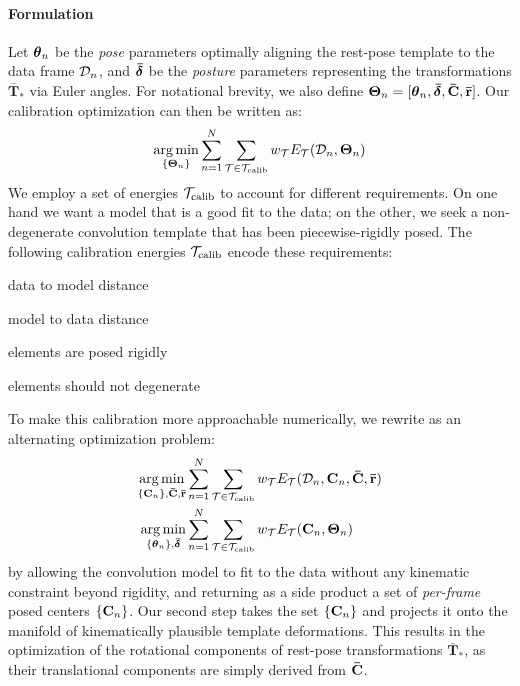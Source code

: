 \paragraph{Formulation}
Let $\boldsymbol{\theta}_n$ be the \emph{pose} parameters optimally aligning the rest-pose template to the data frame $\mathcal{D}_n$, and $\boldsymbol{\bar\delta}$ be the \emph{posture} parameters representing the transformations $\mathbf{\bar{T}}_*$ via Euler angles. For notational brevity, we also define $\boldsymbol{\Theta}_n=[\boldsymbol{\theta}_n, \boldsymbol{\bar\delta}, {\mathbf{\bar{C}}}, {\mathbf{\bar{r}}}]$. Our calibration optimization can then be written as:
% 
\begin{eqnarray}
\operatorname*{arg\,min}_{\{\boldsymbol{\Theta}_n\}}
\sum_{n=1}^N 
\sum_{\mathcal{T} \in {\mathcal{T}_\text{calib}}} 
w_\mathcal{T} E_\mathcal{T}(\mathcal{D}_n, \boldsymbol{\Theta}_n)
\label{eq:calibration}
\end{eqnarray}
% 
We employ a set of energies ${\mathcal{T}_\text{calib}}$ to account for different requirements. On one hand we want a model that is a good fit to the data; on the other, we seek a non-degenerate convolution template that has been piecewise-rigidly posed. The following calibration energies ${\mathcal{T}_\text{calib}}$ encode these requirements:
% 
\begin{description}[labelsep=0em,labelwidth=.4in,labelindent=1cm,itemsep=-.6em]
\item[d2m] data to model distance
\item[m2d] model to data distance
\item[rigid] elements are posed rigidly
\item[valid] elements should not degenerate
\end{description}
% 
To make this calibration more approachable numerically, we rewrite  as an alternating optimization problem:
% 
\begin{eqnarray}
\operatorname*{arg\,min}_{{\{\mathbf{C}_n\}}, {\mathbf{\bar{C}}}, {\mathbf{\bar{r}}}} &
\sum_{n=1}^N 
\sum_{\mathcal{T} \in {\mathcal{T}_\text{calib}}}
w_\mathcal{T} E_\mathcal{T}(\mathcal{D}_n, {\mathbf{C}}_n, {\mathbf{\bar{C}}}, {\mathbf{\bar{r}}})
\label{eq:step1}
\\
\operatorname*{arg\,min}_{{\{\boldsymbol{\theta}_n\}},\boldsymbol{\bar\delta}} &
\sum_{n=1}^N 
\sum_{\mathcal{T} \in {\mathcal{T}_\text{calib}}}
w_\mathcal{T} E_\mathcal{T}({\mathbf{C}}_n, \boldsymbol{\Theta}_n) 
\end{eqnarray}
% 
 by allowing the convolution model to fit to the data without any kinematic constraint beyond rigidity, and returning as a side product a set of \emph{per-frame} posed centers ${\{\mathbf{C}_n\}}$. 
Our second step takes the set ${\{\mathbf{C}_n\}}$ and projects it onto the manifold of kinematically plausible template deformations. 
This results in the optimization of the rotational components of rest-pose transformations $\mathbf{\bar{T}}_*$, as their translational components are simply derived from ${\mathbf{\bar{C}}}$.


